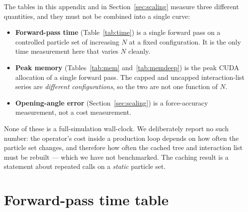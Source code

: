 The tables in this appendix and in Section~\ref{sec:scaling} measure three different quantities, and
they must not be combined into a single curve:
\begin{itemize}\itemsep2pt
\item \textbf{Forward-pass time} (Table~\ref{tab:time}) is a single forward pass on a controlled
particle set of increasing $N$ at a fixed configuration. It is the only time measurement here that
varies $N$ cleanly.
\item \textbf{Peak memory} (Tables~\ref{tab:mem} and~\ref{tab:memdeep}) is the peak CUDA allocation
of a single forward pass. The capped and uncapped interaction-list series are \emph{different
configurations}, so the two are not one function of $N$.
\item \textbf{Opening-angle error} (Section~\ref{sec:scaling}) is a force-accuracy measurement, not a
cost measurement.
\end{itemize}
\noindent None of these is a full-simulation wall-clock. We deliberately report no such number: the
operator's cost inside a production loop depends on how often the particle set changes, and therefore
how often the cached tree and interaction list must be rebuilt --- which we have not benchmarked. The
caching result is a statement about repeated calls on a \emph{static} particle set.

\section{Forward-pass time table}\label{app:tables}
\begin{table}[h]
\centering
\caption{Forward-pass time of the HMMP operator versus $N$ at fixed configuration
(\texttt{scripts/\allowbreak scaling.\allowbreak py}), post-D8, one A800. Over a $20\times$ range in $N$ the time grows
$47.79\times$. We do \textbf{not} read an exponent from this: the same configuration on CPU grows
$26.68\times$ over the same range, so the ratio is device-dependent and the small-$N$ end is
overhead-dominated. The admitted far-interaction count --- measured by the two-arm comparison of
\texttt{scripts/\allowbreak compare\_\allowbreak d8\_\allowbreak cost\_\allowbreak ab.\allowbreak py}, which prints the two reference ratios beside it --- grows
$71.0\times$ over the same range, i.e.\ faster than $O(N\log N)$, because the benchmark clouds are
not self-similar. Four points cannot separate these, so we report the measurements rather than a
fitted exponent.}
\label{tab:time}
\end{table}

